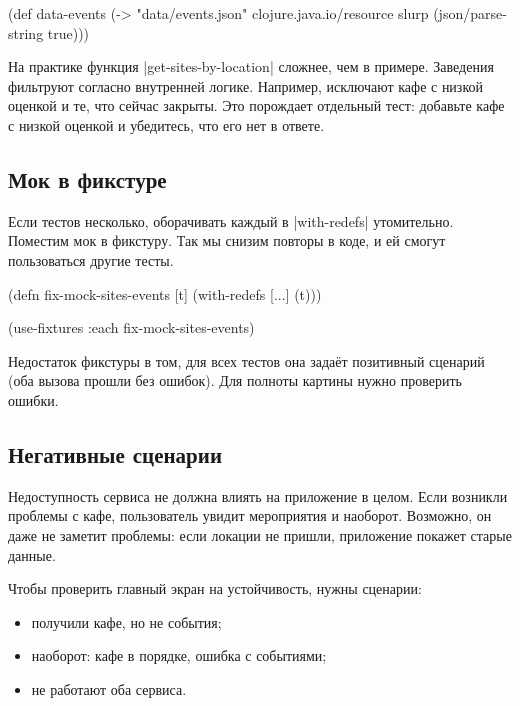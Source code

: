
\begin{english}
  \begin{clojure}
(def data-events
  (-> "data/events.json"
      clojure.java.io/resource
      slurp
      (json/parse-string true)))
  \end{clojure}
\end{english}

На практике функция \spverb|get-sites-by-location| сложнее, чем в
примере. Заведения фильтруют согласно внутренней логике. Например, исключают
кафе с низкой оценкой и те, что сейчас закрыты. Это порождает отдельный тест:
добавьте кафе с низкой оценкой и убедитесь, что его нет в ответе.

\subsection{Мок в фикстуре}


Если тестов несколько, оборачивать каждый в \spverb|with-redefs|
утомительно. Поместим мок в фикстуру. Так мы снизим повторы в коде, и ей смогут
пользоваться другие тесты.

\begin{english}
  \begin{clojure}
(defn fix-mock-sites-events [t]
  (with-redefs [...]
    (t)))

(use-fixtures :each fix-mock-sites-events)
  \end{clojure}
\end{english}

Недостаток фикстуры в том, для всех тестов она задаёт позитивный сценарий (оба
вызова прошли без ошибок). Для полноты картины нужно проверить ошибки.

\subsection{Негативные сценарии}


Недоступность сервиса не должна влиять на приложение в целом. Если возникли
проблемы с кафе, пользователь увидит мероприятия и наоборот. Возможно, он даже
не заметит проблемы: если локации не пришли, приложение покажет старые данные.

Чтобы проверить главный экран на устойчивость, нужны сценарии:

\begin{itemize}

\item
  получили кафе, но не события;

\item
  наоборот: кафе в порядке, ошибка с событиями;

\item
  не работают оба сервиса.

\end{itemize}

